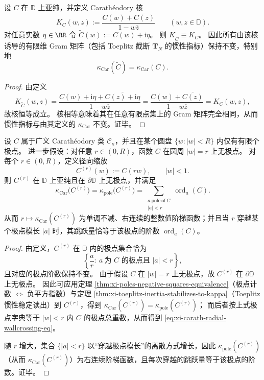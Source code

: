 \begin{proposition}\label{prop:xi-carath-imag-constant-invisible}
设 \(C\) 在 \(\mathbb{D}\) 上亚纯，并定义 Carath\'eodory 核
\[
K_C(w,z):=\frac{C(w)+\overline{C(z)}}{1-w\overline z}\qquad(w,z\in\mathbb{D}).
\]
对任意实数 \(\eta\in\RR\) 令 \(\widetilde C(w):=C(w)+\mathrm{i}\eta\)。
则 \(K_{\widetilde C}\equiv K_C\)。
因此所有由该核诱导的有限维 Gram 矩阵（包括 Toeplitz 截断 \(\mathbf{T}_N\) 的惯性指标）保持不变，特别地
\[
\kappa_{\mathrm{Car}}(\widetilde C)=\kappa_{\mathrm{Car}}(C).
\]
\end{proposition}
\begin{proof}
由定义
\[
K_{\widetilde C}(w,z)=\frac{C(w)+\mathrm{i}\eta+\overline{C(z)+\mathrm{i}\eta}}{1-w\overline z}
=\frac{C(w)+\overline{C(z)}}{1-w\overline z}
=K_C(w,z),
\]
故核恒等成立。
核相等意味着其在任意有限点集上的 Gram 矩阵完全相同，从而惯性指标与由其定义的 \(\kappa_{\mathrm{Car}}\) 不变。证毕。
\end{proof}

\begin{theorem}\label{thm:xi-carath-radial-wallcrossing}
设 \(C\) 属于广义 Carath\'eodory 类 \(\mathcal{C}_{\kappa}\)，并且在某个圆盘 \(\{w:|w|<R\}\) 内仅有有限个极点。
进一步假设：对任意 \(r\in(0,R)\)，函数 \(C\) 在圆周 \(|w|=r\) 上无极点。
对每个 \(r\in(0,R)\)，定义径向缩放
\[
C^{(r)}(w):=C(rw),\qquad |w|<1.
\]
则 \(C^{(r)}\) 在 \(\mathbb{D}\) 上亚纯且在 \(\partial\mathbb{D}\) 上无极点，并满足
\begin{equation}\label{eq:xi-carath-radial-wallcrossing-eq}
\boxed{\;
\kappa_{\mathrm{Car}}\!\bigl(C^{(r)}\bigr)
=\kappa_{\mathrm{pole}}\!\bigl(C^{(r)}\bigr)
=\sum_{\substack{a\ \mathrm{pole\ of}\ C\\ |a|<r}}\operatorname{ord}_{a}(C).\;}
\end{equation}
从而 \(r\mapsto \kappa_{\mathrm{Car}}(C^{(r)})\) 为单调不减、右连续的整数值阶梯函数；并且当 \(r\) 穿越某个极点模长 \(|a|\) 时，其跳跃量恰等于该极点的阶数 \(\operatorname{ord}_{a}(C)\)。
\end{theorem}
\begin{proof}
由定义，\(C^{(r)}\) 在 \(\mathbb{D}\) 内的极点集合恰为
\[
\left\{\frac{a}{r}:\ a\ \text{为 }C\text{ 的极点且 }|a|<r\right\},
\]
且对应的极点阶数保持不变。
由于假设 \(C\) 在 \(|w|=r\) 上无极点，故 \(C^{(r)}\) 在 \(\partial\mathbb{D}\) 上无极点。
因此可应用定理 \ref{thm:xi-poles-negative-squares-equivalence}（极点计数 \(\Longleftrightarrow\) 负平方指数）与定理 \ref{thm:xi-toeplitz-inertia-stabilizes-to-kappa}（Toeplitz 惯性稳定读出）到 \(C^{(r)}\)，得到
\(\kappa_{\mathrm{Car}}(C^{(r)})=\kappa_{\mathrm{pole}}(C^{(r)})\)；
而后者按上式极点字典等于 \(|w|<r\) 内 \(C\) 的极点总重数，从而得到 \eqref{eq:xi-carath-radial-wallcrossing-eq}。
\par
随 \(r\) 增大，集合 \(\{|a|<r\}\) 以“穿越极点模长”的离散方式增长，因此 \(\kappa_{\mathrm{pole}}(C^{(r)})\)（从而 \(\kappa_{\mathrm{Car}}(C^{(r)})\)）为右连续阶梯函数，且每次穿越的跳跃量等于该极点的阶数。证毕。
\end{proof}

